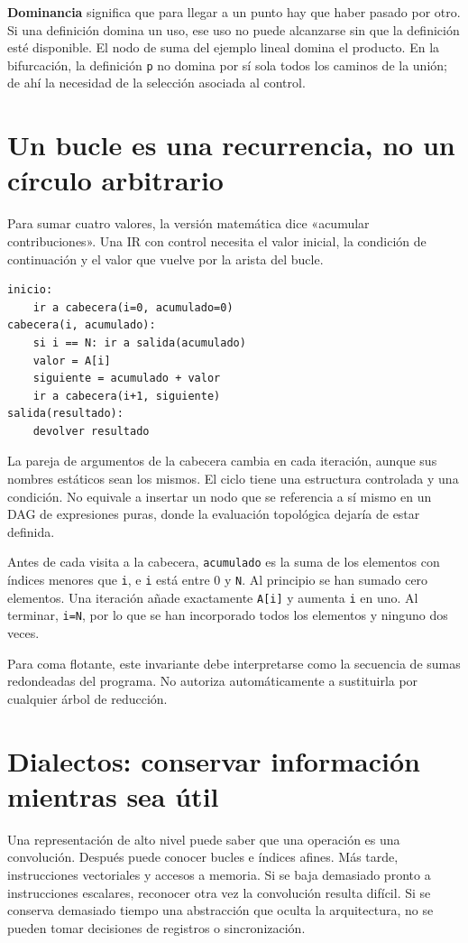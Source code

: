 \documentclass[12pt,a4paper,oneside]{report}
\begin{document}
\textbf{Dominancia} significa que para llegar a un punto hay que haber pasado por otro. Si una definición domina un uso, ese uso no puede alcanzarse sin que la definición esté disponible. El nodo de suma del ejemplo lineal domina el producto. En la bifurcación, la definición \texttt{p} no domina por sí sola todos los caminos de la unión; de ahí la necesidad de la selección asociada al control.

\section{Un bucle es una recurrencia, no un círculo arbitrario}
Para sumar cuatro valores, la versión matemática dice «acumular contribuciones». Una IR con control necesita el valor inicial, la condición de continuación y el valor que vuelve por la arista del bucle.

\begin{lstlisting}
inicio:
    ir a cabecera(i=0, acumulado=0)
cabecera(i, acumulado):
    si i == N: ir a salida(acumulado)
    valor = A[i]
    siguiente = acumulado + valor
    ir a cabecera(i+1, siguiente)
salida(resultado):
    devolver resultado
\end{lstlisting}
La pareja de argumentos de la cabecera cambia en cada iteración, aunque sus nombres estáticos sean los mismos. El ciclo tiene una estructura controlada y una condición. No equivale a insertar un nodo que se referencia a sí mismo en un DAG de expresiones puras, donde la evaluación topológica dejaría de estar definida.

\begin{ejemplo}
Antes de cada visita a la cabecera, \texttt{acumulado} es la suma de los elementos con índices menores que \texttt{i}, e \texttt{i} está entre 0 y \texttt{N}. Al principio se han sumado cero elementos. Una iteración añade exactamente \texttt{A[i]} y aumenta \texttt{i} en uno. Al terminar, \texttt{i=N}, por lo que se han incorporado todos los elementos y ninguno dos veces.

Para coma flotante, este invariante debe interpretarse como la secuencia de sumas redondeadas del programa. No autoriza automáticamente a sustituirla por cualquier árbol de reducción.

\end{ejemplo}
\section{Dialectos: conservar información mientras sea útil}
Una representación de alto nivel puede saber que una operación es una convolución. Después puede conocer bucles e índices afines. Más tarde, instrucciones vectoriales y accesos a memoria. Si se baja demasiado pronto a instrucciones escalares, reconocer otra vez la convolución resulta difícil. Si se conserva demasiado tiempo una abstracción que oculta la arquitectura, no se pueden tomar decisiones de registros o sincronización.
\end{document}
